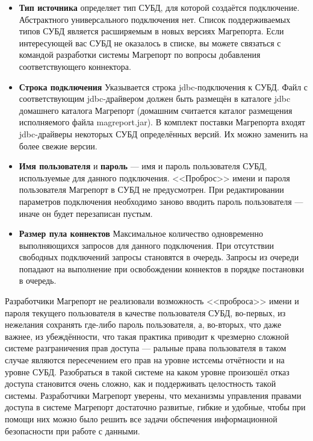 \documentclass[../user-manual.tex]{subfiles}
\begin{document}
	\begin{itemize}
		\item \textbf{Тип источника} определяет тип СУБД, для которой создаётся подключение. Абстрактного универсального подключения нет. Список поддерживаемых типов СУБД является расширяемым в новых версиях Магрепорта. Если интересующей вас СУБД не оказалось в списке, вы можете связаться с командой разработки системы Магрепорт по вопросы добавления соответствующего коннектора.
		
		\item \textbf{Строка подключения} Указывается строка jdbc-подключения к СУБД. Файл с соответствующим jdbc-драйвером должен быть размещён в каталоге jdbc домашнего каталога Магрепорт (домашним считается каталог размещения исполняемого файла magreport.jar). В комплект поставки Магрепорта входят jdbc-драйверы некоторых СУБД определённых версий. Их можно заменить на более свежие версии.
		
		\item \textbf{Имя пользователя} и \textbf{пароль} --- имя и пароль пользователя СУБД, используемые для данного подключения. <<Проброс>> имени и пароля пользователя Магрепорт в СУБД не предусмотрен. При редактировании параметров подключения необходимо заново вводить пароль пользователя --- иначе он будет перезаписан пустым.
		
		\item \textbf{Размер пула коннектов} Максимальное количество одновременно выполняющихся запросов для данного подключения. При отсутствии свободных подключений запросы становятся в очередь. Запросы из очереди попадают на выполнение при освобождении коннектов в порядке постановки в очередь.
		
	\end{itemize}

	\begin{concept}
		Разработчики Магрепорт не реализовали возможность <<проброса>> имени и пароля текущего пользователя в качестве пользователя СУБД, во-первых, из нежелания сохранять где-либо пароль пользователя, а, во-вторых, что даже важнее, из убеждённости, что такая практика приводит к чрезмерно сложной системе разграничения прав доступа --- ральные права пользователя в таком случае являются пересечением его прав на уровне истсемы отчётности и на уровне СУБД. Разобраться в такой системе на каком уровне произошёл отказ доступа становится очень сложно, как и поддерживать целостность такой системы. Разработчики Магрепорт уверены, что механизмы управления правами доступа в системе Магрепорт достаточно развитые, гибкие и удобные, чтобы при помощи них можно было решить все задачи обспечения информационной безопасности при работе с данными. 
	\end{concept}
\end{document}

